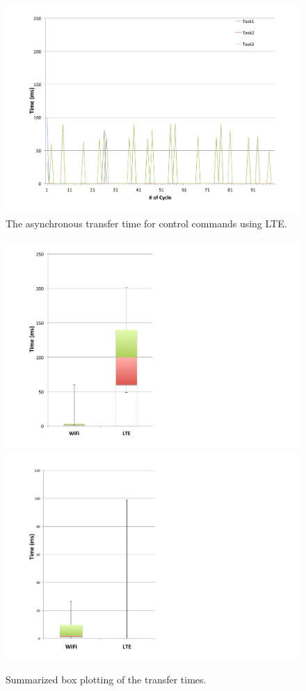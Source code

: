 \begin{figure}[!t]
 \centering
 \includegraphics[width=\hsize]{fig/No5_Andrive_serv_cycle_LTE_only_send.pdf}
 \caption{The asynchronous transfer time for control commands using LTE.}
 \label{fig:no5}
\end{figure}

\begin{figure}[!t]
 \centering
 \includegraphics[width=0.45\hsize]{fig/No3_Andrive_boxplot_compare_WiFi_and_LTE.pdf}
 \includegraphics[width=0.45\hsize]{fig/No7_Andrive_only_send_boxplot_compare_WiFi_and_LTE.pdf}
 \caption{Summarized box plotting of the transfer times.}
 \label{fig:no3_7}
\end{figure}

